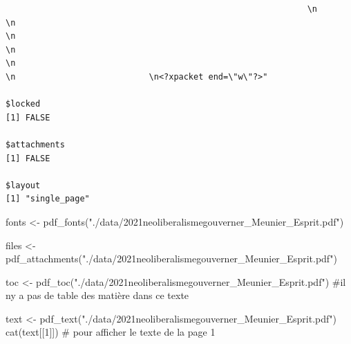 \documentclass[
  letterpaper,
  DIV=11,
  numbers=noendperiod]{scrreprt}
\newenvironment{Shaded}{\begin{snugshade}}{\end{snugshade}}
\newcommand{\CommentTok}[1]{\textcolor[rgb]{0.37,0.37,0.37}{#1}}
\newcommand{\DecValTok}[1]{\textcolor[rgb]{0.68,0.00,0.00}{#1}}
\newcommand{\FunctionTok}[1]{\textcolor[rgb]{0.28,0.35,0.67}{#1}}
\newcommand{\NormalTok}[1]{\textcolor[rgb]{0.00,0.23,0.31}{#1}}
\newcommand{\OtherTok}[1]{\textcolor[rgb]{0.00,0.23,0.31}{#1}}
\newcommand{\StringTok}[1]{\textcolor[rgb]{0.13,0.47,0.30}{#1}}
\begin{document}
\begin{verbatim}
                                                             \n                                                                                                    \n                                                                                                    \n                                                                                                    \n                                                                                                    \n                                                                                                    \n                           \n<?xpacket end=\"w\"?>"

$locked
[1] FALSE

$attachments
[1] FALSE

$layout
[1] "single_page"
\end{verbatim}

\begin{Shaded}
\begin{Highlighting}[]
\NormalTok{fonts }\OtherTok{\textless{}{-}} \FunctionTok{pdf\_fonts}\NormalTok{(}\StringTok{"./data/2021neoliberalismegouverner\_Meunier\_Esprit.pdf"}\NormalTok{)}

\NormalTok{files }\OtherTok{\textless{}{-}} \FunctionTok{pdf\_attachments}\NormalTok{(}\StringTok{"./data/2021neoliberalismegouverner\_Meunier\_Esprit.pdf"}\NormalTok{)}

\NormalTok{toc }\OtherTok{\textless{}{-}} \FunctionTok{pdf\_toc}\NormalTok{(}\StringTok{"./data/2021neoliberalismegouverner\_Meunier\_Esprit.pdf"}\NormalTok{) }\CommentTok{\#il n\textquotesingle{}y a pas de table des matière dans ce texte}

\NormalTok{text }\OtherTok{\textless{}{-}} \FunctionTok{pdf\_text}\NormalTok{(}\StringTok{"./data/2021neoliberalismegouverner\_Meunier\_Esprit.pdf"}\NormalTok{)}
\FunctionTok{cat}\NormalTok{(text[[}\DecValTok{1}\NormalTok{]]) }\CommentTok{\# pour afficher le texte de la page 1}
\end{Highlighting}
\end{Shaded}
\end{document}
